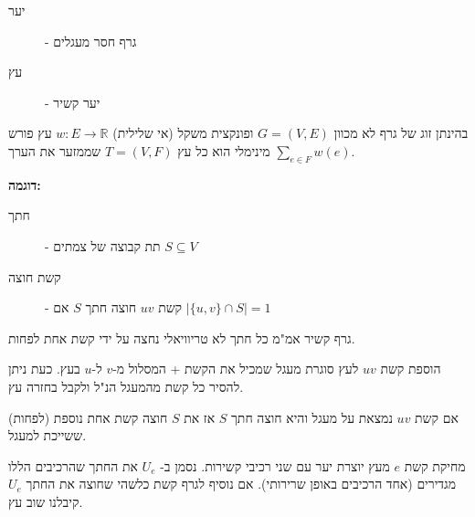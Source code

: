 \begin{description}
\item[יער] - 
גרף חסר מעגלים
\item[עץ] - 
יער קשיר
\end{description}

\begin{definition}
בהינתן זוג של גרף לא מכוון 
$G = (V, E)$
ופונקצית משקל (אי שלילית)
$w:E \to \mathbb{R}$
עץ פורש מינימלי הוא כל עץ 
$T = (V, F)$
שממזער את הערך 
$\displaystyle\sum_{e \in F} w(e)$.
\end{definition}

\textbf{דוגמה:}
\begin{center}
\end{center}


\begin{description}
\item[חתך] - 
תת קבוצה של צמתים 
$S \subseteq V$
\item[קשת חוצה] - 
קשת $uv$ חוצה חתך $S$ אם 
$| \{u,v\} \cap S | = 1$
\end{description}

\begin{observation}
גרף קשיר אמ"מ כל חתך לא טריוויאלי נחצה על ידי קשת אחת לפחות.
\end{observation}


\begin{observation}
הוספת קשת $uv$ לעץ סוגרת מעגל שמכיל את הקשת + המסלול מ-$v$ ל-$u$ בעץ.
כעת ניתן להסיר כל קשת מהמעגל הנ"ל ולקבל בחזרה עץ.
\end{observation}

\begin{observation}
\label{observation:cycle}
אם קשת $uv$ נמצאת על מעגל והיא חוצה חתך $S$ אז את $S$ חוצה קשת אחת נוספת (לפחות)
ששייכת למעגל.
\end{observation}

\begin{observation}
מחיקת קשת $e$ מעץ יוצרת יער עם שני רכיבי קשירות.
נסמן ב-%
$U_e$
את החתך שהרכיבים הללו מגדירים (אחד הרכיבים באופן שרירותי).
אם נוסיף לגרף קשת כלשהי שחוצה את החתך 
$U_e$
קיבלנו שוב עץ.
\end{observation}
